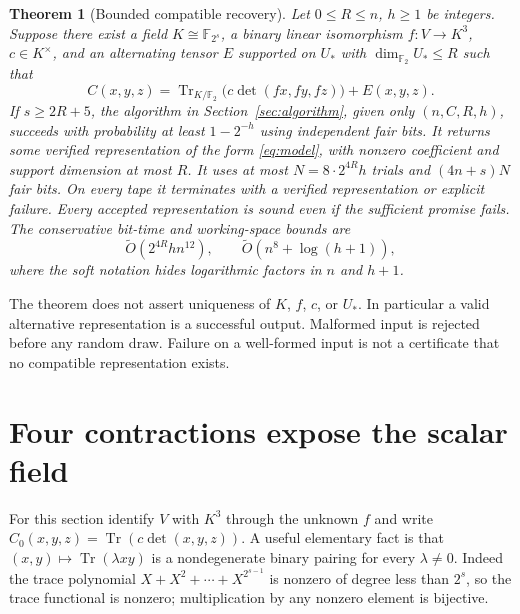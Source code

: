 \documentclass[11pt]{article}
\newtheorem{theorem}{Theorem}
\newcommand{\F}{\mathbb F}
\newcommand{\Tr}{\operatorname{Tr}}
\begin{document}
\begin{theorem}[Bounded compatible recovery]\label{thm:main}
Let $0\leq R\leq n$, $h\geq1$ be integers. Suppose there exist a field
$K\cong\F_{2^s}$, a binary linear isomorphism $f:V\to K^3$, $c\in K^\times$,
and an alternating tensor $E$ supported on $U_*$ with $\dim_{\F_2}U_*\leq R$
such that
\begin{equation}\label{eq:model}
 C(x,y,z)=\Tr_{K/\F_2}\bigl(c\det(fx,fy,fz)\bigr)+E(x,y,z).
\end{equation}
If $s\geq2R+5$, the algorithm in Section~\ref{sec:algorithm}, given only
$(n,C,R,h)$, succeeds with probability at least $1-2^{-h}$ using independent
fair bits. It returns some verified representation of the form
\eqref{eq:model}, with nonzero coefficient and support dimension at most $R$.
It uses at most $N=8\cdot2^{4R}h$ trials and $(4n+s)N$ fair bits.
On every tape it terminates with a verified representation or explicit failure.
Every accepted representation is sound even if the sufficient promise fails.
The conservative bit-time and working-space bounds are
\begin{equation}\label{eq:cost}
 \widetilde O(2^{4R}h n^{12}),\qquad
 \widetilde O(n^8+\log(h+1)),
\end{equation}
where the soft notation hides logarithmic factors in $n$ and $h+1$.
\end{theorem}

The theorem does not assert uniqueness of $K$, $f$, $c$, or $U_*$. In
particular a valid alternative representation is a successful output.
Malformed input is rejected before any random draw. Failure on a well-formed
input is not a certificate that no compatible representation exists.

\section{Four contractions expose the scalar field}
For this section identify $V$ with $K^3$ through the unknown $f$ and write
$C_0(x,y,z)=\Tr(c\det(x,y,z))$. A useful elementary fact is that
$(x,y)\mapsto\Tr(\lambda xy)$ is a nondegenerate binary pairing for every
$\lambda\ne0$. Indeed the trace polynomial
$X+X^2+\cdots+X^{2^{s-1}}$ is nonzero of degree less than $2^s$, so the
trace functional is nonzero; multiplication by any nonzero element is bijective.
\end{document}
